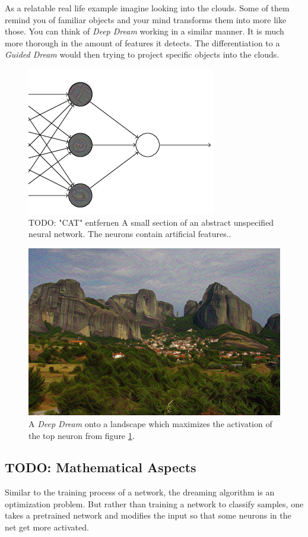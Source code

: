 As a relatable real life example imagine looking into the clouds.
Some of them remind you of familiar objects and your mind transforms them into more like those.
You can think of \emph{Deep Dream} working in a similar manner.
It is much more thorough in the amount of features it detects.
The differentiation to a \emph{Guided Dream} would then trying to project specific objects into the clouds.

\begin{figure}[H]
	\centering
	\includegraphics[width=0.5\linewidth]{img/neurons-reaction.png}
	\caption{TODO: "CAT" entfernen A small section of an abstract unspecified neural network. The neurons contain artificial features.\cite{nielsen2015neural}.}
	\label{fig:neuronreact}
\end{figure}

\begin{figure}[H]
	\centering
	\includegraphics[width=0.7\linewidth]{img/applied_neuron.jpg}
	\caption{A \textit{Deep Dream} onto a landscape which maximizes the activation of the top neuron from figure \ref{fig:neuronreact}.\cite{imgmeteora}}
	\label{fig:applieddream}
\end{figure}




\subsection{TODO: Mathematical Aspects}
Similar to the training process of a network, the dreaming algorithm is an optimization problem.
But rather than training a network to classify samples, one takes a pretrained network and modifies the input so that some neurons in the net get more activated.


